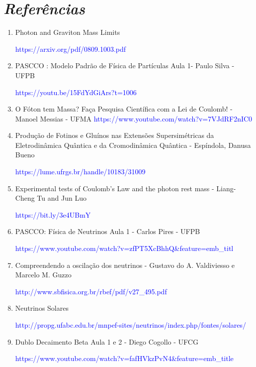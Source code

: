 \documentclass{article}
\begin{document}
\section*{\textit{Referências}}
\begin{enumerate}
    \item{Photon and Graviton Mass Limits}
    
    \textcolor{blue}{https://arxiv.org/pdf/0809.1003.pdf}
    
    \item{PASCCO : Modelo Padrão de Física de Partículas Aula 1- Paulo Silva - UFPB}
    
   \textcolor{blue}{https://youtu.be/15FdYdGiArs?t=1006}
   
   \item{O Fóton tem Massa? Faça Pesquisa Científica com a Lei de Coulomb! - Manoel Messias - UFMA}
   \textcolor{blue}{https://www.youtube.com/watch?v=7VJdRF2nIC0}
   
   \item{Produção de Fotinos e Gluínos nas Extensões Supersimétricas da Eletrodinâmica Quântica e da Cromodinâmica Quântica - Espíndola, Danusa Bueno}
   
   \textcolor{blue}{https://lume.ufrgs.br/handle/10183/31009}
   
   \item{Experimental tests of Coulomb's Law and the photon rest mass - Liang-Cheng Tu and Jun Luo}
   
 \textcolor{blue}{https://bit.ly/3e4UBmY} 
 
   \item{PASCCO: Física de Neutrinos Aula 1 - Carlos Pires - UFPB}

\textcolor{blue}{https://www.youtube.com/watch?v=zfPT5XcBhhQ&feature=emb_titl}

   \item{Compreendendo a oscilação dos neutrinos - Gustavo do A. Valdiviesso e Marcelo M. Guzzo}
 
   
\textcolor{blue}{http://www.sbfisica.org.br/rbef/pdf/v27_495.pdf}
   
   
   \item{Neutrinos Solares} 
   
   \textcolor{blue}{http://propg.ufabc.edu.br/mnpef-sites/neutrinos/index.php/fontes/solares/}
   
   \item{Dublo Decaimento Beta Aula 1 e 2 - Diego Cogollo - UFCG}
   
   \textcolor{blue}{https://www.youtube.com/watch?v=fafHVkzPvN4&feature=emb_title}
   

\end{enumerate}
\end{document}
